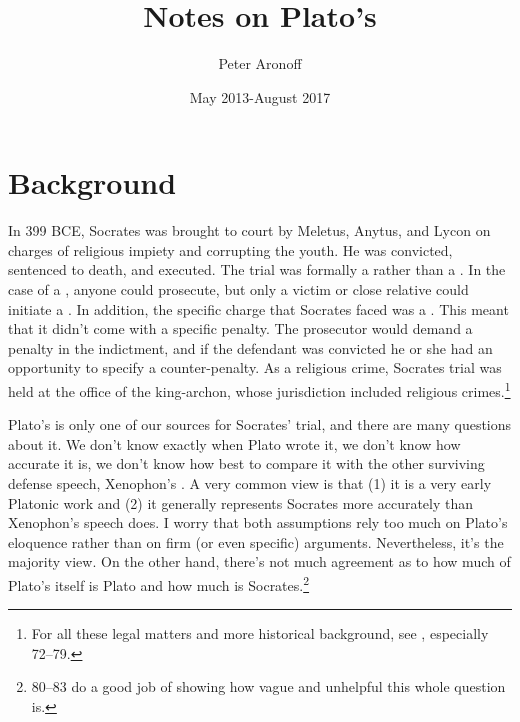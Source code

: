 \documentclass[11pt]{article}
\begin{document}
\begin{titlepage}
\title{Notes on Plato's }
\author{Peter Aronoff}
\date{May 2013-August 2017}
\maketitle
\thispagestyle{empty}
\end{titlepage}

\section{Background}

In 399 BCE, Socrates was brought to court by Meletus, Anytus, and Lycon on charges of religious impiety and corrupting the youth.  He was convicted, sentenced to death, and executed.  The trial was formally a  rather than a .  In the case of a , anyone could prosecute, but only a victim or close relative could initiate a .  In addition, the specific charge that Socrates faced was a .  This meant that it didn't come with a specific penalty.  The prosecutor would demand a penalty in the indictment, and if the defendant was convicted he or she had an opportunity to specify a counter-penalty.  As a religious crime, Socrates trial was held at the office of the king-archon, whose jurisdiction included religious crimes.\footnote{For all these legal matters and more historical background, see \citet{brickhousesmith2004}, especially 72--79.} 

Plato's  is only one of our sources for Socrates' trial, and there are many questions about it.  We don't know exactly when Plato wrote it, we don't know how accurate it is, we don't know how best to compare it with the other surviving defense speech, Xenophon's .  A very common view is that (1) it is a very early Platonic work and (2) it generally represents Socrates more accurately than Xenophon's speech does.  I worry that both assumptions rely too much on Plato's eloquence rather than on firm (or even specific) arguments.  Nevertheless, it's the majority view.  On the other hand, there's not much agreement as to how much of Plato's  itself is Plato and how much is Socrates.\footnote{ \citet{brickhousesmith2004} 80--83 do a good job of showing how vague and unhelpful this whole question is.} 
\end{document}
